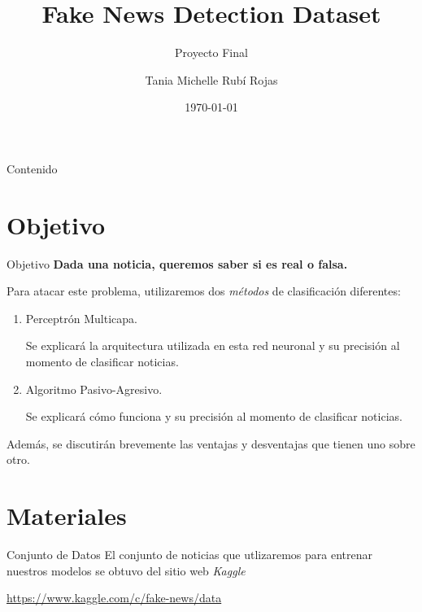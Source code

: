 \documentclass[11pt]{beamer}
\author{Tania Michelle Rubí Rojas}
\title[Fake News Detection Dataset]{Fake News Detection Dataset}
\date{\today}
\subtitle{Proyecto Final}
\institute[UNAM]{Facultad de Ciencias, UNAM}
\begin{document}
\begin{frame}
\maketitle
\end{frame}

\begin{frame}{Contenido}
\tableofcontents
\end{frame}

\section{Objetivo}
\begin{frame}{Objetivo}
\justifying
\textbf{Dada una noticia, queremos saber si es real o falsa.}

Para atacar este problema, utilizaremos dos \textit{métodos} de 
clasificación diferentes:
\begin{enumerate}
    \item Perceptrón Multicapa.
    
    Se explicará la arquitectura utilizada en esta red neuronal
    y su precisión al momento de clasificar noticias.
    \item Algoritmo Pasivo-Agresivo.
    
    Se explicará cómo funciona y su precisión al momento de 
    clasificar noticias.
\end{enumerate}

Además, se discutirán brevemente las ventajas y desventajas que
tienen uno sobre otro.  
\end{frame}
	
\section{Materiales}
\begin{frame}{Conjunto de Datos}
    \justifying
    El conjunto de noticias que utlizaremos para entrenar nuestros modelos
    se obtuvo del sitio web \textit{Kaggle}
    \begin{center}
        \url{https://www.kaggle.com/c/fake-news/data}
    \end{center}
\end{frame}
\end{document}
